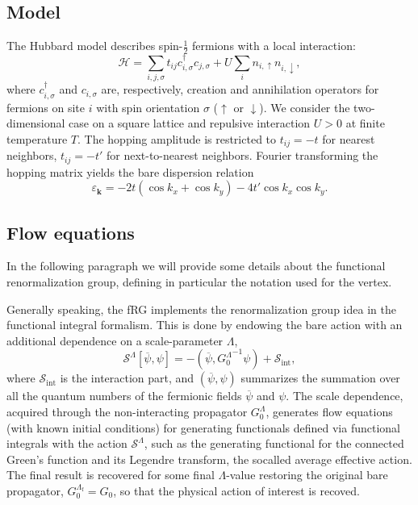 
\subsection{Model}

The Hubbard model\cite{Hubbard1963} describes spin-$\frac{1}{2}$ fermions with a local interaction:
\begin{equation}
 \mathcal{H} = \sum_{i,j,\sigma} t_{ij} c^{\dagger}_{i,\sigma} c_{j,\sigma}
 + U \sum_{i} n_{i,\uparrow} n_{i,\downarrow} ,
\end{equation}
where $c^{\dagger}_{i,\sigma}$ and $c_{i,\sigma}$ are, respectively, creation and annihilation operators for fermions on site $i$ with spin orientation $\sigma$ ($\uparrow$ or $\downarrow$). We consider the two-dimensional case on a square lattice and repulsive interaction $U>0$ at finite temperature $T$. The hopping amplitude is restricted to $t_{ij} = -t$ for nearest neighbors, $t_{ij}=-t'$ for next-to-nearest neighbors. Fourier transforming the hopping matrix yields the bare dispersion relation
\begin{equation}
 \varepsilon_{\mathbf{k}} =
 -2t \left( \cos{k_x} + \cos{k_y} \right) -4 t' \cos{k_x} \cos{k_y} .
\end{equation}


\subsection{Flow equations}

In the following paragraph we will provide some details about the functional renormalization group,\cite{Metzner2012,Platt2013} defining in particular the notation used for the vertex. 

Generally speaking, the fRG implements the renormalization group idea in the functional integral formalism. 
This is done by endowing the bare action with an additional dependence on a scale-parameter $\Lambda$,\cite{Metzner2012,Platt2013} 
\begin{equation}
 \mathcal{S}^\Lambda[\overline\psi,\psi] =
 -(\overline\psi,{G_0^\Lambda}^{-1}\psi)+\mathcal{S}_{\mathrm{int}},  
\end{equation} 
where $\mathcal{S}_{\mathrm{int}}$ is the interaction part, and $(\overline\psi,\psi)$ summarizes the summation over all the quantum numbers of the fermionic fields  $\overline \psi$ and $\psi$. 
The scale dependence, acquired through the non-interacting propagator $G_0^\Lambda$, generates flow equations (with known initial conditions) for generating functionals defined via functional integrals with the action $\mathcal{S}^\Lambda$, such as the generating functional for the connected Green's function and its Legendre transform, the socalled average effective action.\cite{Wetterich1993}
The final result is recovered for some final $\Lambda$-value restoring the original bare propagator, $G_0^{\Lambda_\mathrm{f}} = G_0$, so that the physical action of interest is recoved.  

